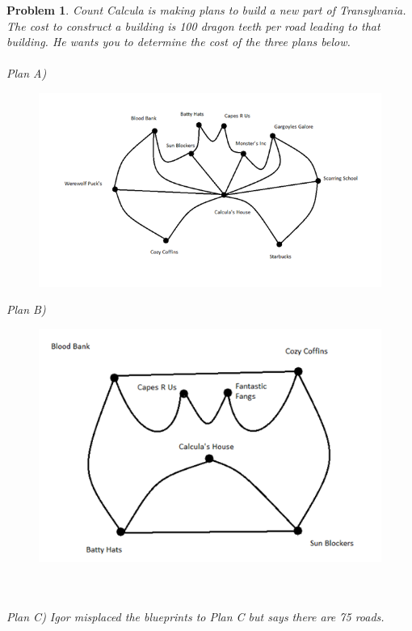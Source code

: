 \documentclass{article}
\newtheorem{problem}{Problem}
\begin{document}
\begin{problem}
Count Calcula is making plans to build a new part of Transylvania. The cost to construct a building is 100 dragon teeth per road leading to that building. He wants you to determine the cost of the three plans below.
\\
\\
Plan A)

\begin{figure}[h!]
\centering
\includegraphics[scale=.7]{plana}
\end{figure}



Plan B)
\begin{figure}[h!]
\centering
\includegraphics[scale=.7]{planb}
\end{figure}
\\
\\
Plan C)
Igor misplaced the blueprints to Plan C but says there are 75 roads.
\end{problem}
\end{document}
